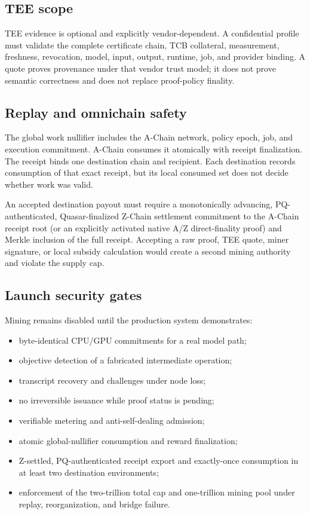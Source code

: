 \subsection{TEE scope}

TEE evidence is optional and explicitly vendor-dependent. A confidential profile
must validate the complete certificate chain, TCB collateral, measurement,
freshness, revocation, model, input, output, runtime, job, and provider binding.
A quote proves provenance under that vendor trust model; it does not prove
semantic correctness and does not replace proof-policy finality.

\subsection{Replay and omnichain safety}

The global work nullifier includes the A-Chain network, policy epoch, job, and
execution commitment. A-Chain consumes it atomically with receipt finalization.
The receipt binds one destination chain and recipient. Each destination records
consumption of that exact receipt, but its local consumed set does not decide
whether work was valid.

An accepted destination payout must require a monotonically advancing,
PQ-authenticated, Quasar-finalized Z-Chain settlement commitment to the A-Chain
receipt root (or an explicitly activated native A/Z direct-finality proof) and
Merkle inclusion of the full receipt. Accepting a raw proof, TEE quote, miner
signature, or local subsidy calculation would create a second mining authority
and violate the supply cap.

\subsection{Launch security gates}

Mining remains disabled until the production system demonstrates:

\begin{itemize}[leftmargin=1.2em]
  \item byte-identical CPU/GPU commitments for a real model path;
  \item objective detection of a fabricated intermediate operation;
  \item transcript recovery and challenges under node loss;
  \item no irreversible issuance while proof status is pending;
  \item verifiable metering and anti-self-dealing admission;
  \item atomic global-nullifier consumption and reward finalization;
  \item Z-settled, PQ-authenticated receipt export and exactly-once consumption in at
        least two destination environments;
  \item enforcement of the two-trillion total cap and one-trillion mining pool
        under replay, reorganization, and bridge failure.
\end{itemize}
